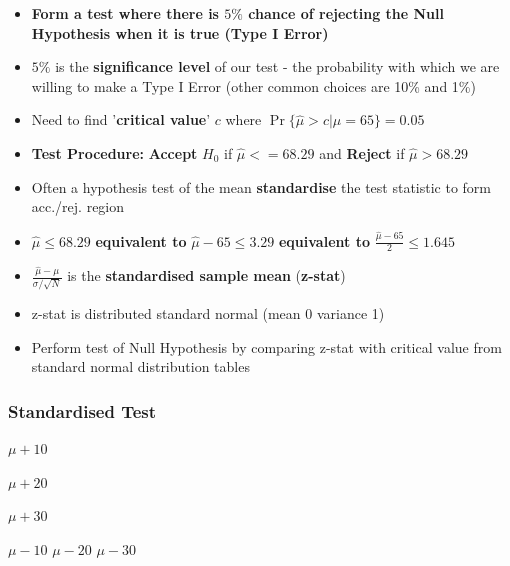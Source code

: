 \documentclass{beamer}
\begin{document}
\begin{frame}
\begin{itemize}
	\frametitle{Formalising a Statistical Test}
	
	
		
	\item[] \textbf{Form a test where there is $5\%$ chance of rejecting the Null Hypothesis when it is true (\textbf{Type I Error})}
		\vspace{25pt}
		\pause
		\item[]   $5\%$ is  the \textbf{significance level} of our test - the probability with which we are willing to make a Type I Error (other common choices are 10\% and 1\%)
		\pause
			\vspace{25pt}
	\item[] Need to find '\textbf{critical value}' $c$ where  $\Pr\{\hat{\mu}>c | \mu=65\}=0.05$
		\vspace{25pt} \pause
	\item[] \textbf{Test Procedure:} \textbf{Accept} $H_0$ if $\hat{\mu}<=68.29$ and \textbf{Reject} if $\hat{\mu}>68.29$
	
	

	\end{itemize}
\end{frame}


\begin{frame}
\begin{itemize}
	\frametitle{Standardised Test}
	
	
	\item[]  Often a hypothesis test of the mean \textbf{standardise} the test statistic to form acc./rej. region
			\vspace{15pt} \pause
	\item[] $\hat{\mu}\leq 68.29$  \textbf{equivalent to}  $\hat{\mu}-65\leq 3.29$ \textbf{equivalent to} $\frac{\hat{\mu}-65}{2}\leq 1.645$
			\vspace{15pt}\pause
	\item[] $\frac{\hat{\mu}-\mu}{\sigma/\sqrt{N}}$ is the \textbf{standardised sample mean} (\textbf{z-stat})
				\vspace{15pt}\pause
	\item[]  z-stat is distributed standard normal (mean 0 variance 1)
				\vspace{15pt}
	\item[] Perform test of Null Hypothesis by comparing z-stat with critical value from standard normal distribution tables
	
\end{itemize}
\end{frame}

\begin{frame}
\begin{itemize}
	\frametitle{Standardised Test}
\tiny
 $\mu+10$ \hspace{30pt}
 
   $\mu+20$ \hspace{30pt}
   
   $\mu+30$ \hspace{30pt}
   
    $\mu-10$\hspace{30pt}
     $\mu-20$\hspace{30pt}
      $\mu-30$
	
\end{itemize}
\end{frame}


		
\end{document}

